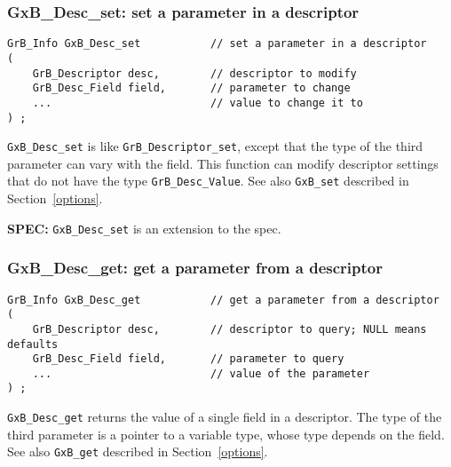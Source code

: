\documentclass[12pt]{article}
\begin{document}
\newpage
\subsubsection{{\sf GxB\_Desc\_set:}  set a parameter in a descriptor}
\label{desc_set}

\begin{mdframed}[userdefinedwidth=6in]
{\footnotesize
\begin{verbatim}
GrB_Info GxB_Desc_set           // set a parameter in a descriptor
(
    GrB_Descriptor desc,        // descriptor to modify
    GrB_Desc_Field field,       // parameter to change
    ...                         // value to change it to
) ;
\end{verbatim} } \end{mdframed}

\verb'GxB_Desc_set' is like \verb'GrB_Descriptor_set', except that the
type of the third parameter can vary with the field.   This function can
modify descriptor settings that do not have the type \verb'GrB_Desc_Value'.
See also \verb'GxB_set' described in Section~\ref{options}.

\begin{spec}
{\bf SPEC:} \verb'GxB_Desc_set' is an extension to the spec.
\end{spec}

\subsubsection{{\sf GxB\_Desc\_get:}  get a parameter from a descriptor}
\label{desc_get}

\begin{mdframed}[userdefinedwidth=6in]
{\footnotesize
\begin{verbatim}
GrB_Info GxB_Desc_get           // get a parameter from a descriptor
(
    GrB_Descriptor desc,        // descriptor to query; NULL means defaults
    GrB_Desc_Field field,       // parameter to query
    ...                         // value of the parameter
) ;
\end{verbatim} } \end{mdframed}

\verb'GxB_Desc_get' returns the value of a single field in a descriptor.  The
type of the third parameter is a pointer to a variable type, whose type depends
on the field.  See also \verb'GxB_get' described in Section~\ref{options}.
\end{document}
